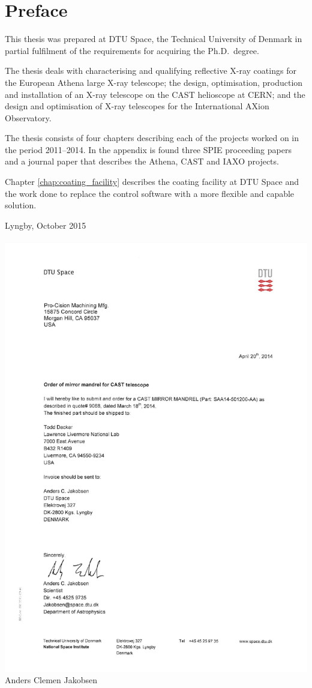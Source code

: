 \chapter{Preface}
This thesis was prepared at DTU Space,
the Technical University of Denmark in partial fulfilment of the
requirements for acquiring the Ph.D.\ degree.

The thesis deals with characterising and qualifying reflective X-ray coatings for the European Athena large X-ray telescope; the design, optimisation, production and installation of an X-ray telescope on the CAST helioscope at CERN; and the design and optimisation of X-ray telescopes for the International AXion Observatory.

The thesis consists of four chapters describing each of the projects worked on in the period 2011--2014. In the appendix is found three SPIE proceeding papers and a journal paper that describes the Athena, CAST and IAXO projects.

Chapter \ref{chap:coating_facility} describes the coating facility at DTU Space and the work done to replace the control software with a more flexible and capable solution.

\vspace{20mm}
\mbox{}\hfill
\begin{minipage}[t]{80mm}
  Lyngby, October 2015
  \\ \\
  \mbox{} \hspace{0mm} \includegraphics{figures/signature.pdf}\\
Anders Clemen Jakobsen
\end{minipage}
